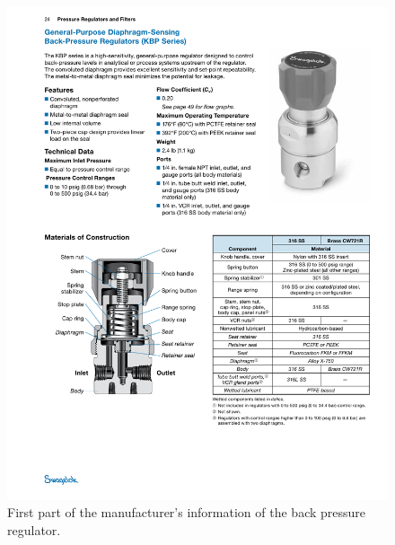 \begin{figure}[h]
    \centering
    \includegraphics[width=\textwidth]{fig/BPR-1.pdf}
    \caption{First part of the manufacturer's information of the back pressure regulator.}
    \label{fig:swagelok_bpr_1}
\end{figure}

